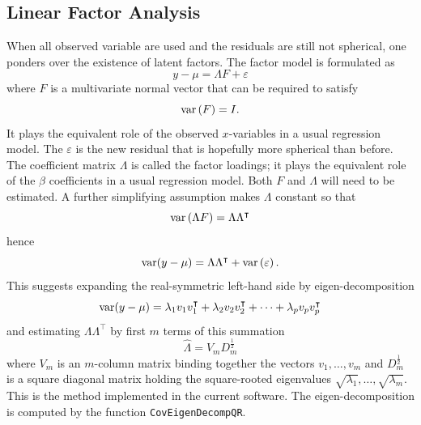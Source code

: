 \documentclass[article]{jss}
\numberwithin{equation}{subsection}
\begin{document}
        \subsection[egFactor]{Linear Factor Analysis}
        When all observed variable are used and the residuals are still not spherical, one ponders over the existence of latent factors. The factor model is formulated as
        $$y  - \mu = \Lambda F + \varepsilon$$
        where $F$ is a multivariate normal vector that can be required to satisfy 
        $${\mathop{\rm var}} \left( F \right) = I.$$
        It plays the equivalent role of the observed $x$-variables in a usual regression model. The $\varepsilon$ is the new residual that is hopefully more spherical than before. The coefficient matrix $\Lambda$ is called the factor loadings; it plays the equivalent role of the $\beta$ coefficients in a usual regression model. Both $F$ and $\Lambda$ will need to be estimated. A further simplifying assumption makes $\Lambda$ constant so that
        \begin{equation}\label{eq:common covariance}
	        {\mathop{\rm var}} \left( {\Lambda F} \right) = \Lambda {\Lambda ^\intercal}
        \end{equation}
        hence
        \begin{equation}
	        {\mathop{\rm var}} (y - \mu ) = \Lambda {\Lambda ^\intercal} + {\mathop{\rm var}} \left( \varepsilon  \right).
        \end{equation}
        This suggests expanding the real-symmetric left-hand side by eigen-decomposition
        \begin{equation}
	        {\mathop{\rm var}} (y - \mu ) = {\lambda _1}{v_1}v_1^\intercal + {\lambda _2}{v_2}v_2^\intercal +  \cdots  + {\lambda _p}{v_p}v_p^\intercal
        \end{equation}
        and estimating $\Lambda {\Lambda ^\intercal}$ by first $m$ terms of this summation 
        \begin{equation}\label{eq:loading matrix}
        \hat\Lambda = V_m D_m^{\frac{1}{2}}
        \end{equation}
        where $V_m$ is an $m$-column matrix binding together the vectors $v_1, \ldots, v_m$ and $D_m^\frac{1}{2}$ is a square diagonal matrix holding the square-rooted eigenvalues $\sqrt{\lambda_1}, \ldots, \sqrt{\lambda_m}$.
        This is the method implemented in the current software. The eigen-decomposition is computed by the  function \texttt{CovEigenDecompQR}.
        
\end{document}
